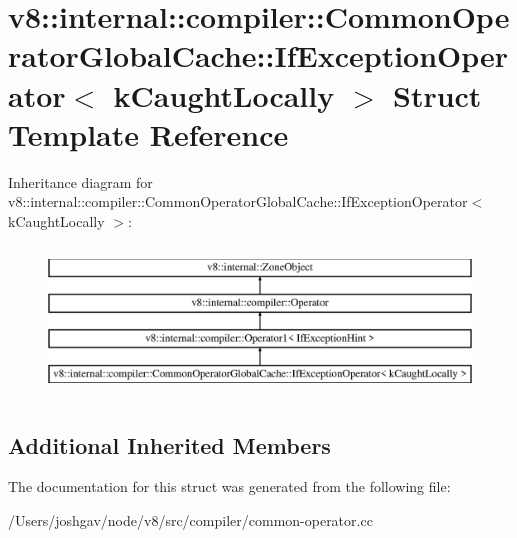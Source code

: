 \hypertarget{structv8_1_1internal_1_1compiler_1_1_common_operator_global_cache_1_1_if_exception_operator}{}\section{v8\+:\+:internal\+:\+:compiler\+:\+:Common\+Operator\+Global\+Cache\+:\+:If\+Exception\+Operator$<$ k\+Caught\+Locally $>$ Struct Template Reference}
\label{structv8_1_1internal_1_1compiler_1_1_common_operator_global_cache_1_1_if_exception_operator}
Inheritance diagram for v8\+:\+:internal\+:\+:compiler\+:\+:Common\+Operator\+Global\+Cache\+:\+:If\+Exception\+Operator$<$ k\+Caught\+Locally $>$\+:\begin{figure}[H]
\begin{center}
\leavevmode
\includegraphics[height=4.000000cm]{structv8_1_1internal_1_1compiler_1_1_common_operator_global_cache_1_1_if_exception_operator}
\end{center}
\end{figure}
\subsection*{Additional Inherited Members}


The documentation for this struct was generated from the following file\+:\begin{DoxyCompactItemize}
\item 
/\+Users/joshgav/node/v8/src/compiler/common-\/operator.\+cc\end{DoxyCompactItemize}
